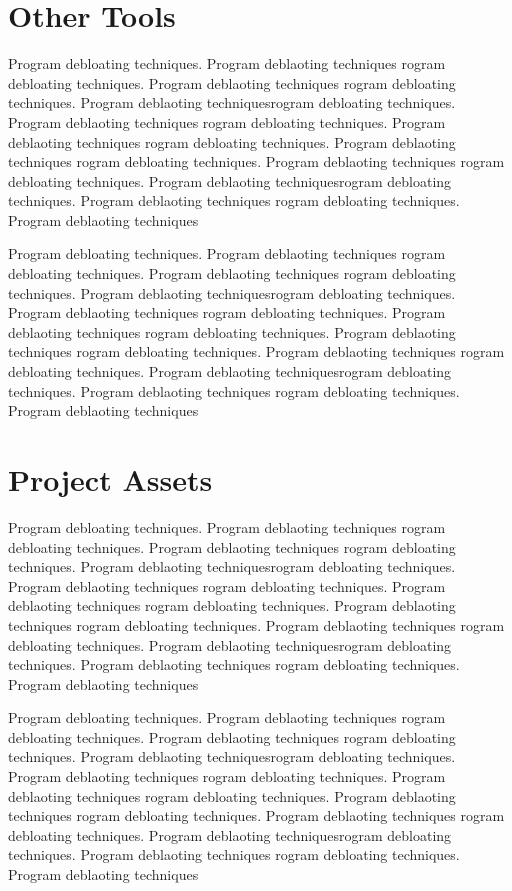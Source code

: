 \documentclass{relatorio}
\begin{document}
\section{Other Tools}%
\label{Tools}

Program debloating techniques. Program deblaoting techniques rogram debloating techniques. Program deblaoting techniques
rogram debloating techniques. Program deblaoting techniquesrogram debloating techniques. Program deblaoting techniques
rogram debloating techniques. Program deblaoting techniques rogram debloating techniques. Program deblaoting techniques
rogram debloating techniques. Program deblaoting techniques 
rogram debloating techniques. Program deblaoting techniquesrogram debloating techniques. Program deblaoting techniques
rogram debloating techniques. Program deblaoting techniques

Program debloating techniques. Program deblaoting techniques rogram debloating techniques. Program deblaoting techniques
rogram debloating techniques. Program deblaoting techniquesrogram debloating techniques. Program deblaoting techniques
rogram debloating techniques. Program deblaoting techniques rogram debloating techniques. Program deblaoting techniques
rogram debloating techniques. Program deblaoting techniques 
rogram debloating techniques. Program deblaoting techniquesrogram debloating techniques. Program deblaoting techniques
rogram debloating techniques. Program deblaoting techniques

\section{Project Assets}%
\label{Tools}

Program debloating techniques. Program deblaoting techniques rogram debloating techniques. Program deblaoting techniques
rogram debloating techniques. Program deblaoting techniquesrogram debloating techniques. Program deblaoting techniques
rogram debloating techniques. Program deblaoting techniques rogram debloating techniques. Program deblaoting techniques
rogram debloating techniques. Program deblaoting techniques 
rogram debloating techniques. Program deblaoting techniquesrogram debloating techniques. Program deblaoting techniques
rogram debloating techniques. Program deblaoting techniques

Program debloating techniques. Program deblaoting techniques rogram debloating techniques. Program deblaoting techniques
rogram debloating techniques. Program deblaoting techniquesrogram debloating techniques. Program deblaoting techniques
rogram debloating techniques. Program deblaoting techniques rogram debloating techniques. Program deblaoting techniques
rogram debloating techniques. Program deblaoting techniques 
rogram debloating techniques. Program deblaoting techniquesrogram debloating techniques. Program deblaoting techniques
rogram debloating techniques. Program deblaoting techniques
\end{document}
